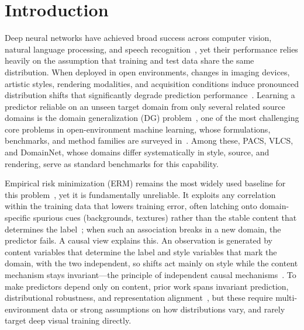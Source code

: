 \documentclass[electronics,article,submit,moreauthors]{Definitions/mdpi}
\begin{document}
\section{Introduction}

Deep neural networks have achieved broad success across computer vision, natural language processing, and speech recognition~\citep{ref1}, yet their performance relies heavily on the assumption that training and test data share the same distribution. When deployed in open environments, changes in imaging devices, artistic styles, rendering modalities, and acquisition conditions induce pronounced distribution shifts that significantly degrade prediction performance~\citep{ref2,ref3}. Learning a predictor reliable on an unseen target domain from only several related source domains is the domain generalization (DG) problem~\citep{ref2}, one of the most challenging core problems in open-environment machine learning, whose formulations, benchmarks, and method families are surveyed in~\citep{ref45}. Among these, PACS, VLCS, and DomainNet, whose domains differ systematically in style, source, and rendering, serve as standard benchmarks for this capability.

Empirical risk minimization (ERM) remains the most widely used baseline for this problem~\citep{ref2}, yet it is fundamentally unreliable. It exploits any correlation within the training data that lowers training error, often latching onto domain-specific spurious cues (backgrounds, textures) rather than the stable content that determines the label~\citep{ref4}; when such an association breaks in a new domain, the predictor fails. A causal view explains this. An observation is generated by content variables that determine the label and style variables that mark the domain, with the two independent, so shifts act mainly on style while the content mechanism stays invariant---the principle of independent causal mechanisms~\citep{ref5,ref6}. To make predictors depend only on content, prior work spans invariant prediction, distributional robustness, and representation alignment~\citep{ref7,ref8,ref10,ref11,ref12,ref13}, but these require multi-environment data or strong assumptions on how distributions vary, and rarely target deep visual training directly.
\end{document}
